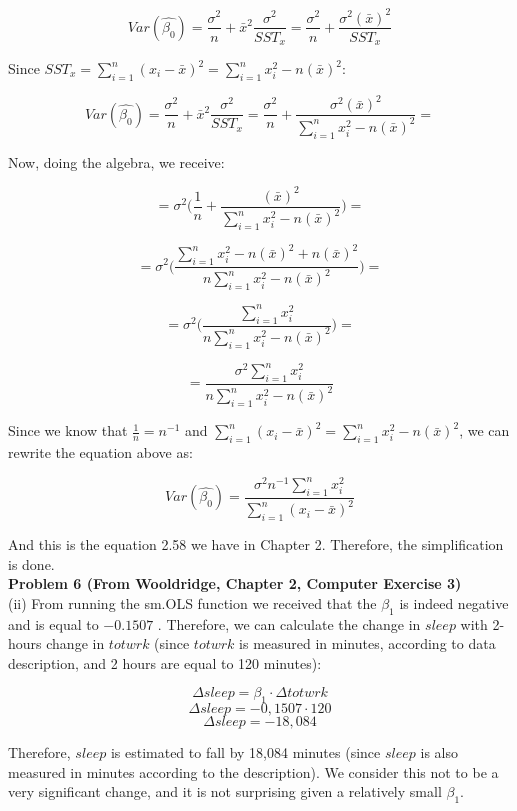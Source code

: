 \documentclass{article}
\begin{document}
$$Var(\hat{\beta_0})=\frac{\sigma^2}{n} + \bar{x}^2\frac{\sigma^2}{SST_x}=\frac{\sigma^2}{n} + \frac{\sigma^2 (\bar{x})^2}{SST_x}$$

Since $SST_x = \sum_{i=1}^{n} (x_i - \bar{x})^2 = \sum_{i=1}^{n} x_i^2 - n(\bar{x})^2$:

$$Var(\hat{\beta_0})=\frac{\sigma^2}{n} + \bar{x}^2\frac{\sigma^2}{SST_x}=\frac{\sigma^2}{n} + \frac{\sigma^2 (\bar{x})^2}{\sum_{i=1}^{n} x_i^2 - n(\bar{x})^2} = $$

Now, doing the algebra, we receive:

$$= \sigma^2\biggl(\frac{1}{n} + \frac{(\bar{x})^2}{\sum_{i=1}^{n} x_i^2 - n(\bar{x})^2}\biggr) =$$

$$= \sigma^2\biggl(\frac{\sum_{i=1}^{n} x_i^2 - n(\bar{x})^2 + n(\bar{x})^2}{n\sum_{i=1}^{n} x_i^2 - n(\bar{x})^2}\biggr) = $$

$$= \sigma^2\biggl(\frac{\sum_{i=1}^{n} x_i^2}{n\sum_{i=1}^{n} x_i^2 - n(\bar{x})^2}\biggr) = $$

$$= \frac{\sigma^2\sum_{i=1}^{n} x_i^2}{n\sum_{i=1}^{n} x_i^2 - n(\bar{x})^2}$$

Since we know that $\frac{1}{n} = n^{-1}$ and $\sum_{i=1}^{n} (x_i - \bar{x})^2 = \sum_{i=1}^{n} x_i^2 - n(\bar{x})^2$, we can rewrite the equation above as:

$$Var(\hat{\beta_0}) = \frac{\sigma^2 n^{-1}\sum_{i=1}^{n} x_i^2}{\sum_{i=1}^{n} (x_i - \bar{x})^2}$$

And this is the equation 2.58 we have in Chapter 2. Therefore, the simplification is done.
\\

\textbf{Problem 6 (From Wooldridge, Chapter 2, Computer Exercise 3)}
\\

(ii) From running the sm.OLS function we received that the $\beta_1$ is indeed negative and is equal to $-0.1507$ . Therefore, we can calculate the change in $sleep$ with 2-hours change in $totwrk$ (since $totwrk$ is measured in minutes, according to data description, and 2 hours are equal to 120 minutes):

$$\Delta sleep = \beta_1 \cdot \Delta totwrk$$
$$\Delta sleep = -0,1507 \cdot 120$$
$$\Delta sleep = - 18,084$$

Therefore, $sleep$ is estimated to fall by 18,084 minutes (since $sleep$ is also measured in minutes according to the description). We consider this not to be a very significant change, and it is not surprising given a relatively small $\beta_1$. 
\\
\end{document}
